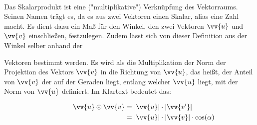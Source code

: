     \paragraph{} Das Skalarprodukt ist eine ("multiplikative") Verknüpfung des Vektorraums. Seinen Namen trägt es, da es aus zwei Vektoren
    einen Skalar, alias eine Zahl macht. Es dient dazu ein Maß für den Winkel, den zwei Vektoren $\vv{u}$ und $\vv{v}$ einschließen,
    festzulegen. Zudem lässt sich von dieser Definition aus der Winkel selber anhand der
    \begin{wrapfigure}[4]{r}[1cm]{0.45\textwidth}
    \end{wrapfigure}

    Vektoren bestimmt werden.
    Es wird als die Multiplikation der Norm der Projektion des Vektors $\vv{v}$ in die Richtung von $\vv{u}$, das heißt, der Anteil
    von $\vv{v}$ der auf der Geraden liegt, entlang welcher $\vv{u}$ liegt, mit der Norm von $\vv{u}$ definiert. Im Klartext bedeutet das:
    \begin{Definition}
      \begin{align*}
          \qquad \qquad \vv{u} \odot \vv{v} &\definedBy |\vv{u}| \cdot |\vv{v'}| \\
                              &= |\vv{u}| \cdot |\vv{v}| \cdot \cos(\alpha) \\
      \end{align*}
    \end{Definition}\\

